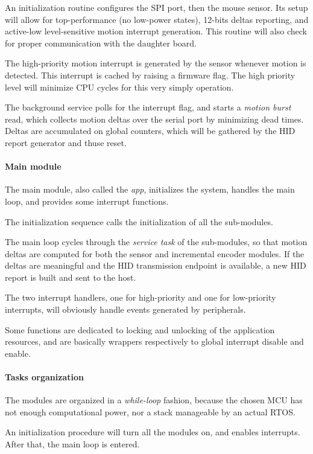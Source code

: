 \documentclass[a4paper,10pt]{article}
\begin{document}
\begin{multicols}{2}
An initialization routine configures the SPI port, then the mouse sensor. Its
setup will allow for top-performance (no low-power states), 12-bits deltas
reporting, and active-low level-sensitive motion interrupt generation.
This routine will also check for proper communication with the daughter board.

The high-priority motion interrupt is generated by the sensor whenever motion
is detected. This interrupt is cached by raising a firmware flag. The high
priority level will minimize CPU cycles for this very simply operation.

The background service polls for the interrupt flag, and starts a \emph{motion
burst} read, which collects motion deltas over the serial port by minimizing
dead times. Deltas are accumulated on global counters, which will be gathered
by the HID report generator and thuse reset.


\paragraph{Main module}
The main module, also called the \emph{app}, initializes the system, handles
the main loop, and provides some interrupt functions.

The initialization sequence calls the initialization of all the sub-modules.

The main loop cycles through the \emph{service task} of the sub-modules, so
that motion deltas are computed for both the sensor and incremental encoder
modules. If the deltas are meaningful and the HID transmission endpoint is
available, a new HID report is built and sent to the host.

The two interrupt handlers, one for high-priority and one for low-priority
interrupts, will obviously handle events generated by peripherals.

Some functions are dedicated to locking and unlocking of the application
resources, and are basically wrappers respectively to global interrupt disable
and enable.


\paragraph{Tasks organization}
The modules are organized in a \emph{while-loop} fashion, because the chosen
MCU has not enough computational power, nor a stack manageable by an actual
RTOS.

An initialization procedure will turn all the modules on, and enables
interrupts. After that, the main loop is entered.


\end{multicols}
\end{document}
